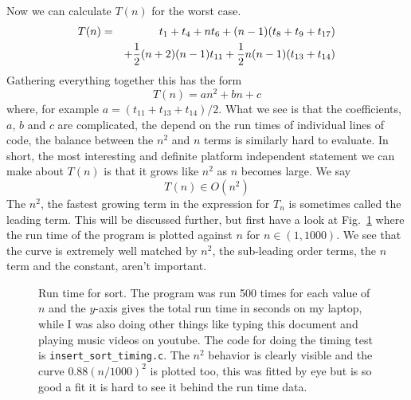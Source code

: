 \documentclass[11pt,a4paper]{scrartcl}
\begin{document}
Now we can calculate $T(n)$ for the worst case.
\begin{eqnarray}
T(n)&=&t_1+t_4+nt_6+(n-1)(t_8+t_9+t_{17})\cr&&+\frac{1}{2}(n+2)(n-1)t_{11}+\frac{1}{2}n(n-1)(t_{13}+t_{14})
\end{eqnarray}
Gathering everything together this has the form
\begin{equation}
T(n)=an^2+bn+c
\end{equation}
where, for example $a=(t_{11}+t_{13}+t_{14})/2$. What we see is that
the coefficients, $a$, $b$ and $c$ are complicated, the depend on the
run times of individual lines of code, the balance between the $n^2$
and $n$ terms is similarly hard to evaluate. In short, the most
interesting and definite platform independent statement we can make
about $T(n)$ is that it grows like $n^2$ as $n$ becomes large. We say
\begin{equation}
T(n)\in O(n^2)
\end{equation}
The $n^2$, the fastest growing term in the expression for $T_n$ is
sometimes called the leading term. This will be discussed further, but
first have a look at Fig.~\ref{fig_insert_sort_timing} where the run
time of the program is plotted against $n$ for $n\in(1,1000)$. We see
that the curve is extremely well matched by $n^2$, the sub-leading
order terms, the $n$ term and the constant, aren't important.

\begin{figure}

\caption{Run time for sort. The program was run 500 times for each
  value of $n$ and the $y$-axis gives the total run time in seconds on
  my laptop, while I was also doing other things like typing this
  document and playing music videos on youtube. The code for doing the
  timing test is {\tt insert\_sort\_timing.c}. The $n^2$ behavior is
  clearly visible and the curve $0.88(n/1000)^2$ is plotted too, this
  was fitted by eye but is so good a fit it is hard to see it behind
  the run time data.\label{fig_insert_sort_timing}}
\end{figure}
\end{document}
